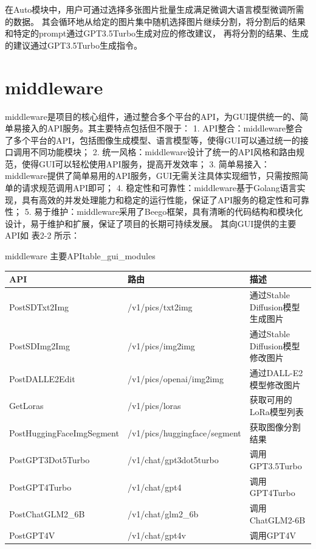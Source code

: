 \documentclass[a4paper,AutoFakeBold,oneside,12pt]{book}
\begin{document}
在Auto模块中，用户可通过选择多张图片批量生成满足微调大语言模型微调所需的数据。
其会循环地从给定的图片集中随机选择图片继续分割，将分割后的结果和特定的prompt通过GPT3.5Turbo生成对应的修改建议，
再将分割的结果、生成的建议通过GPT3.5Turbo生成指令。

\section{middleware}
middleware是项目的核心组件，通过整合多个平台的API，为GUI提供统一的、简单易接入的API服务。其主要特点包括但不限于：
1. API整合：middleware整合了多个平台的API，包括图像生成模型、语言模型等，使得GUI可以通过统一的接口调用不同功能模块；
2. 统一风格：middleware设计了统一的API风格和路由规范，使得GUI可以轻松使用API服务，提高开发效率；
3. 简单易接入：middleware提供了简单易用的API服务，GUI无需关注具体实现细节，只需按照简单的请求规范调用API即可；
4. 稳定性和可靠性：middleware基于Golang语言实现，具有高效的并发处理能力和稳定的运行性能，保证了API服务的稳定性和可靠性；
5. 易于维护：middleware采用了Beego框架，具有清晰的代码结构和模块化设计，易于维护和扩展，保证了项目的长期可持续发展。
其向GUI提供的主要API如 表2-2 所示：
\begin{bupttable}{middleware 主要API}{table_gui_modules}
    \begin{tabular}{|l|l|l|}
        \hline \textbf{API} & \textbf{路由} & \textbf{描述} \\
        \hline PostSDTxt2Img & /v1/pics/txt2img & 通过Stable Diffusion模型生成图片  \\
        \hline PostSDImg2Img & /v1/pics/img2img & 通过Stable Diffusion模型修改图片 \\
        \hline PostDALLE2Edit & /v1/pics/openai/img2img & 通过DALL-E2模型修改图片  \\
		\hline GetLoras & /v1/pics/loras & 获取可用的LoRa模型列表  \\
		\hline PostHuggingFaceImgSegment & /v1/pics/huggingface/segment & 获取图像分割结果  \\
		\hline PostGPT3Dot5Turbo & /v1/chat/gpt3dot5turbo & 调用GPT3.5Turbo  \\
		\hline PostGPT4Turbo & /v1/chat/gpt4 & 调用GPT4Turbo  \\
		\hline PostChatGLM2\_6B & /v1/chat/glm2\_6b & 调用ChatGLM2-6B  \\
		\hline PostGPT4V & /v1/chat/gpt4v & 调用GPT4V  \\
        \hline
    \end{tabular}
\end{bupttable}
\end{document}
